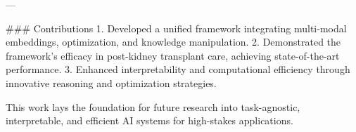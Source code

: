 ---

### Contributions
1. Developed a unified framework integrating multi-modal embeddings, optimization, and knowledge manipulation.
2. Demonstrated the framework's efficacy in post-kidney transplant care, achieving state-of-the-art performance.
3. Enhanced interpretability and computational efficiency through innovative reasoning and optimization strategies.

This work lays the foundation for future research into task-agnostic, interpretable, and efficient AI systems for high-stakes applications.